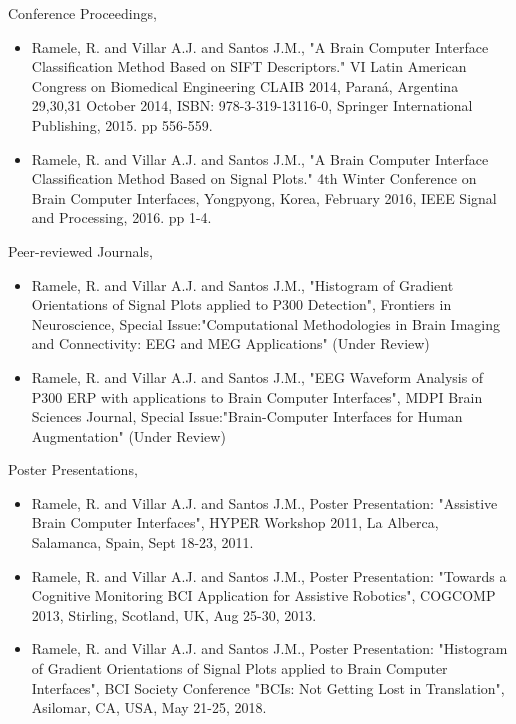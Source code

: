 \documentclass[11pt,twoside,openright]{moddalthesis}
\theoremstyle{definition}
\begin{document}
\begin{listofpubs}

\vspace{-\baselineskip}
\vspace{-\baselineskip}

Conference Proceedings,


\begin{itemize}
\item Ramele, R. and Villar A.J. and Santos J.M., "A Brain Computer Interface Classification Method Based on SIFT Descriptors." VI Latin American Congress on Biomedical Engineering CLAIB 2014, Paraná, Argentina 29,30,31 October 2014,  ISBN: 978-3-319-13116-0, Springer International Publishing, 2015. pp 556-559.
\item Ramele, R. and Villar A.J. and Santos J.M.,  "A Brain Computer Interface Classification Method Based on Signal Plots." 4th Winter Conference on Brain Computer Interfaces, Yongpyong, Korea, February 2016, IEEE Signal and Processing, 2016. pp 1-4.
\end{itemize}

Peer-reviewed Journals,

\begin{itemize}
\item Ramele, R. and Villar A.J. and Santos J.M., "Histogram of Gradient Orientations of Signal Plots applied to P300 Detection", Frontiers in Neuroscience, Special Issue:"Computational Methodologies in Brain Imaging and Connectivity: EEG and MEG Applications" (Under Review)
\item Ramele, R. and Villar A.J. and Santos J.M.,  "EEG Waveform Analysis of P300 ERP with applications to Brain Computer Interfaces", MDPI Brain Sciences Journal, Special Issue:"Brain-Computer Interfaces for Human Augmentation" (Under Review)
\end{itemize}


Poster Presentations,

\begin{itemize}
\item Ramele, R. and Villar A.J. and Santos J.M.,  Poster Presentation: "Assistive Brain Computer Interfaces", HYPER Workshop 2011, La Alberca, Salamanca, Spain, Sept 18-23, 2011.
\item Ramele, R. and Villar A.J. and Santos J.M., Poster Presentation: "Towards a Cognitive Monitoring BCI Application for Assistive Robotics", COGCOMP 2013, Stirling, Scotland, UK, Aug 25-30, 2013.
\item Ramele, R. and Villar A.J. and Santos J.M., Poster Presentation: "Histogram of Gradient Orientations of Signal Plots applied to Brain Computer Interfaces", BCI Society Conference "BCIs: Not Getting Lost in Translation", Asilomar, CA, USA, May 21-25, 2018.
\end{itemize}

\end{listofpubs}
\end{document}
